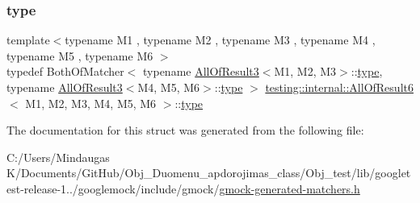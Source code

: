 \subsubsection{\texorpdfstring{type}{type}}
{\footnotesize\ttfamily template$<$typename M1 , typename M2 , typename M3 , typename M4 , typename M5 , typename M6 $>$ \\
typedef Both\+Of\+Matcher$<$ typename \mbox{\hyperlink{structtesting_1_1internal_1_1_all_of_result3}{All\+Of\+Result3}}$<$M1, M2, M3$>$\+::\mbox{\hyperlink{structtesting_1_1internal_1_1_all_of_result6_a5385655911ce2c1d3fccd802c1754139}{type}}, typename \mbox{\hyperlink{structtesting_1_1internal_1_1_all_of_result3}{All\+Of\+Result3}}$<$M4, M5, M6$>$\+::\mbox{\hyperlink{structtesting_1_1internal_1_1_all_of_result6_a5385655911ce2c1d3fccd802c1754139}{type}} $>$ \mbox{\hyperlink{structtesting_1_1internal_1_1_all_of_result6}{testing\+::internal\+::\+All\+Of\+Result6}}$<$ M1, M2, M3, M4, M5, M6 $>$\+::\mbox{\hyperlink{structtesting_1_1internal_1_1_all_of_result6_a5385655911ce2c1d3fccd802c1754139}{type}}}



The documentation for this struct was generated from the following file\+:\begin{DoxyCompactItemize}
\item 
C\+:/\+Users/\+Mindaugas K/\+Documents/\+Git\+Hub/\+Obj\+\_\+\+Duomenu\+\_\+apdorojimas\+\_\+class/\+Obj\+\_\+test/lib/googletest-\/release-\/1../googlemock/include/gmock/\mbox{\hyperlink{_obj__test_2lib_2googletest-release-1_88_81_2googlemock_2include_2gmock_2gmock-generated-matchers_8h}{gmock-\/generated-\/matchers.\+h}}\end{DoxyCompactItemize}
